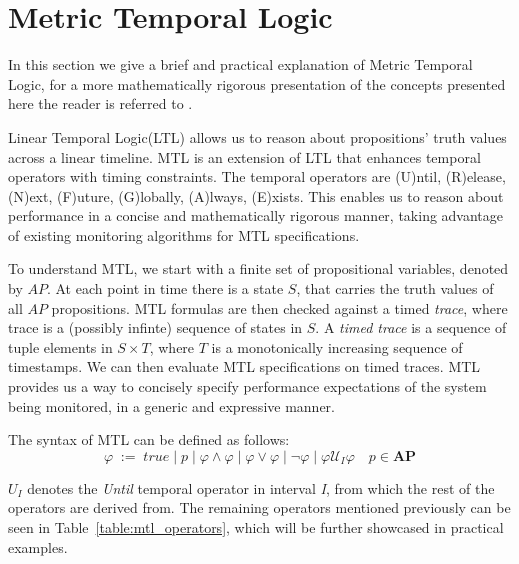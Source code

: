 \documentclass[twocolumn]{article}
\begin{document}
\section{Metric Temporal Logic}
In this section we give a brief and practical explanation of Metric Temporal Logic, for a more mathematically rigorous presentation of the concepts presented here the reader is referred to \cite{hendriks_checking_2016,dhananjayan_metric_2014,thati_monitoring_2005,pnueli_temporal_1977}.
\par
Linear Temporal Logic(LTL) \cite{pnueli_temporal_1977} allows us to reason about propositions' truth values across a linear timeline.
MTL \cite{koymans_specifying_1990} is an extension of LTL that enhances temporal operators with timing constraints. The temporal operators are (U)ntil, (R)elease, (N)ext, (F)uture, (G)lobally, (A)lways, (E)xists.
This enables us to reason about performance in a concise and mathematically rigorous manner, taking advantage of existing
monitoring algorithms for MTL specifications.

\par
To understand MTL, we start with a finite set of propositional variables, denoted by $AP$.
At each point in time there is a state $S$, that carries the truth values of all $AP$ propositions.
MTL formulas are then checked against a timed \emph{trace}, where trace is a (possibly infinte) sequence of states in $S$.
A \emph{timed trace} is a sequence of tuple elements in $S \times T$, where $T$ is a monotonically increasing sequence of timestamps.
We can then evaluate MTL specifications on timed traces.
MTL provides us a way to concisely specify performance expectations of the system being monitored, in a generic and expressive manner.

\par
The syntax of MTL can be defined as follows:
\[
	\varphi \; := \; true \; | \; p \; | \; \varphi \land \varphi \; | \; \varphi \lor \varphi \;| \; \neg \varphi \; | \; \varphi \mathcal{U}_I \varphi \quad p \in \mathbf{AP}
\]

$U_I$ denotes the \emph{Until} temporal operator in interval \emph{I}, from which the rest of the operators are derived from.
The remaining operators mentioned previously can be seen in Table~\ref{table:mtl_operators}, which will
be further showcased in practical examples.
\end{document}
